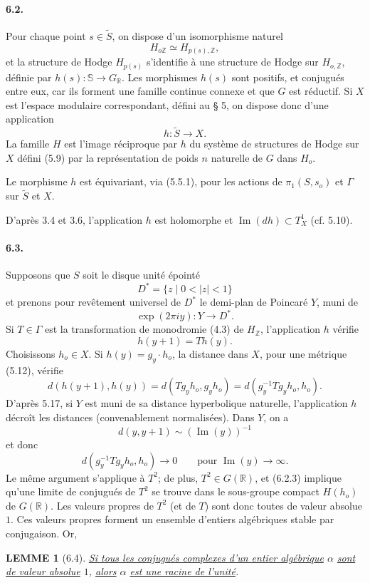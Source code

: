 \documentclass[10pt,leqno]{article}
\newcommand{\R}{\mathbb R}
\newcommand{\Z}{\mathbb Z}
\newcommand{\bS}{\mathbb S}
\theoremstyle{deligne}
\newtheorem*{lemme}{LEMME}
\renewcommand{\underline}[1]{\uline{#1}}
\begin{document}
\paragraph{6.2.}
Pour chaque point $s\in\widetilde S$, on dispose d'un isomorphisme naturel
\[
  H_{o\Z}\simeq H_{p(s),\Z},
\]
et la structure de Hodge $H_{p(s)}$ s'identifie à une structure de Hodge sur $H_{o,\Z}$, définie par $h(s):\bS\to G_\R$. Les morphismes $h(s)$ sont positifs, et conjugués entre eux, car ils forment une famille continue connexe et que $G$ est réductif. Si $X$ est l'espace modulaire correspondant, défini au § 5, on dispose donc d'une application
\[
  h:\widetilde S\longrightarrow X.
\]
La famille $H$ est l'image réciproque par $h$ du système de structures de Hodge sur $X$ défini (5.9) par la représentation de poids $n$ naturelle de $G$ dans $H_o$.

Le morphisme $h$ est équivariant, via (5.5.1), pour les actions de $\pi_1(S,s_o)$ et $\Gamma$ sur $\widetilde S$ et $X$.

D'après 3.4 et 3.6, l'application $h$ est holomorphe et $\operatorname{Im}(dh)\subset T_X^1$ (cf. 5.10).

\paragraph{6.3.}
Supposons que $S$ soit le disque unité épointé
\[
  D^*=\{z\mid 0<|z|<1\}
\]
et prenons pour revêtement universel de $D^*$ le demi-plan de Poincaré $Y$, muni de
\[
  \exp(2\pi i y):Y\longrightarrow D^*.
\]
Si $T\in\Gamma$ est la transformation de monodromie (4.3) de $H_\Z$, l'application $h$ vérifie
\[
\tag{6.3.1}
  h(y+1)=T h(y).
\]
Choisissons $h_o\in X$. Si $h(y)=g_y\cdot h_o$, la distance dans $X$, pour une métrique (5.12), vérifie
\[
\tag{6.3.2}
  d(h(y+1),h(y))=d(Tg_yh_o,g_yh_o)=d(g_y^{-1}Tg_yh_o,h_o).
\]
D'après 5.17, si $Y$ est muni de sa distance hyperbolique naturelle, l'application $h$ décroît les distances (convenablement normalisées). Dans $Y$, on a
\[
  d(y,y+1)\sim (\operatorname{Im}(y))^{-1}
\]
et donc
\[
\tag{6.3.3}
  d(g_y^{-1}Tg_yh_o,h_o)\longrightarrow 0\qquad\text{pour }\operatorname{Im}(y)\to\infty .
\]
Le même argument s'applique à $T^2$; de plus, $T^2\in G(\R)$, et (6.2.3) implique qu'une limite de conjugués de $T^2$ se trouve dans le sous-groupe compact $H(h_o)$ de $G(\R)$. Les valeurs propres de $T^2$ (et de $T$) sont donc toutes de valeur absolue $1$.
Ces valeurs propres forment un ensemble d'entiers algébriques stable par conjugaison. Or,

\begin{lemme}[6.4]
\underline{Si tous les conjugués complexes d'un entier algébrique} $\alpha$ \underline{sont de valeur absolue} $1$, \underline{alors} $\alpha$ \underline{est une racine de l'unité}.
\end{lemme}
\end{document}
